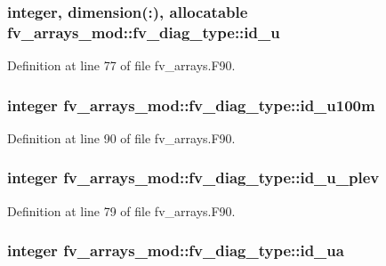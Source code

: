 \subsubsection[{id\-\_\-u}]{\setlength{\rightskip}{0pt plus 5cm}integer, dimension(\-:), allocatable fv\-\_\-arrays\-\_\-mod\-::fv\-\_\-diag\-\_\-type\-::id\-\_\-u}\label{structfv__arrays__mod_1_1fv__diag__type_a257500cfcef6190a0945f608a8c3477c}


Definition at line 77 of file fv\-\_\-arrays.\-F90.

\subsubsection[{id\-\_\-u100m}]{\setlength{\rightskip}{0pt plus 5cm}integer fv\-\_\-arrays\-\_\-mod\-::fv\-\_\-diag\-\_\-type\-::id\-\_\-u100m}\label{structfv__arrays__mod_1_1fv__diag__type_afa53aad1dc4de6f5309ebedeced85dc6}


Definition at line 90 of file fv\-\_\-arrays.\-F90.

\subsubsection[{id\-\_\-u\-\_\-plev}]{\setlength{\rightskip}{0pt plus 5cm}integer fv\-\_\-arrays\-\_\-mod\-::fv\-\_\-diag\-\_\-type\-::id\-\_\-u\-\_\-plev}\label{structfv__arrays__mod_1_1fv__diag__type_af5107a36d7c957fa11fb59c235f39417}


Definition at line 79 of file fv\-\_\-arrays.\-F90.

\subsubsection[{id\-\_\-ua}]{\setlength{\rightskip}{0pt plus 5cm}integer fv\-\_\-arrays\-\_\-mod\-::fv\-\_\-diag\-\_\-type\-::id\-\_\-ua}\label{structfv__arrays__mod_1_1fv__diag__type_a7a4ee8c20891ff161ac67c619f2dd130}


